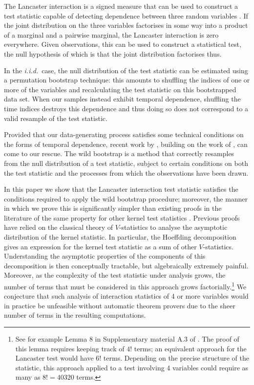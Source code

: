 \documentclass[]{article}
\begin{document}
The Lancaster interaction is a signed measure that can be used to construct a test statistic capable of detecting dependence between three random variables \citep{lancaster1969chi,sejdinovic2013kernel}. If the joint distribution on the three variables factorises in some way into a product of a marginal and a pairwise marginal, the Lancaster interaction is zero everywhere. Given observations, this can be used to construct a statistical test, the null hypothesis of which is that the joint distribution factorises thus. 	

In the \emph{i.i.d.}~case, the null distribution of the test statistic can be estimated using a permutation bootstrap technique: this amounts to shuffling the indices of one or more of the variables and recalculating the test statistic on this bootstrapped data set. When our samples instead exhibit temporal dependence, shuffling the time indices destroys this dependence and thus doing so does not correspond to a valid resample of the test statistic. 

Provided that our data-generating process satisfies some technical conditions on the forms of temporal dependence, recent work by \citet{leucht2013dependent}, building on the work of \citet{shao2010dependent}, can come to our rescue. The wild bootstrap is a method that correctly resamples from the null distribution of a test statistic, subject to certain conditions on both the test statistic and the processes from which the observations have been drawn.

In this paper we show that the Lancaster interaction test statistic satisfies the conditions required to apply the wild bootstrap procedure; moreover, the manner in which we prove this is significantly simpler than existing proofs in the literature of the same property for other kernel test statistics \citep{chwialkowski2014wild,chwialkowski2014kernel}. Previous proofs have relied on the classical theory of $V$-statistics to analyse the asymptotic distribution of the kernel statistic. In particular, the Hoeffding decomposition gives an expression for the kernel test statistic as a sum of other $V$-statistics. Understanding the asymptotic properties of the components of this decomposition is then conceptually tractable, but algebraically extremely painful. Moreover, as the complexity of the test statistic under analysis grows, the number of terms that must be considered in this approach grows factorially.\footnote{See for example Lemma 8 in Supplementary material A.3 of \citet{chwialkowski2014kernel}. The proof of this lemma requires keeping track of $4!$ terms; an equivalent approach for the Lancaster test would have $6!$ terms. Depending on the precise structure of the statistic, this approach applied to a test involving 4 variables could require as many as $8!=40320$ terms.} We conjecture that such analysis of interaction statistics of 4 or more variables would in practice be unfeasible without automatic theorem provers due to the sheer number of terms in the resulting computations.
\end{document}
